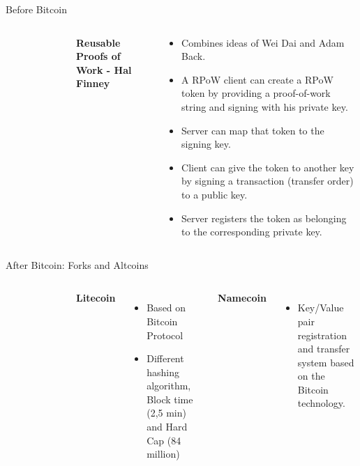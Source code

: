 \documentclass[]{beamer}
\begin{document}
\begin{frame}{Before Bitcoin}
\begin{columns}
\begin{figure}
	\begin{tikzpicture}[scale=1]
			
	\end{tikzpicture}
\end{figure}
	\textbf{Reusable Proofs of Work - Hal Finney}
	\vspace{0.5em}
	\begin{small}
	\begin{itemize}
		\item Combines ideas of Wei Dai and Adam Back.
		\item A RPoW client can create a RPoW token by providing a proof-of-work string and signing with his private key.
		\item Server can map that token to the signing key.
		\item Client can give the token to another key by signing a transaction (transfer order) to a public key.
		\item Server registers the token as belonging to the corresponding private key.
	\end{itemize}
	\end{small}
\end{columns}
\end{frame}


\begin{frame}{After Bitcoin: Forks and Altcoins}
	\begin{columns}
		\begin{figure}
			\begin{tikzpicture}[scale=1]
				
			\end{tikzpicture}
		\end{figure}
		\textbf{Litecoin}
		\vspace{0.5em}
		\begin{itemize}
			\item Based on Bitcoin Protocol
			\item Different hashing algorithm, Block time (2,5 min) and Hard Cap (84 million)
		\end{itemize}
		\vspace{0.5em}
		\textbf{Namecoin}
		\vspace{0.5em}
		\begin{itemize}
			\item Key/Value pair registration and transfer system based on the Bitcoin technology.
		\end{itemize}
	\end{columns}	
\end{frame}
\end{document}
